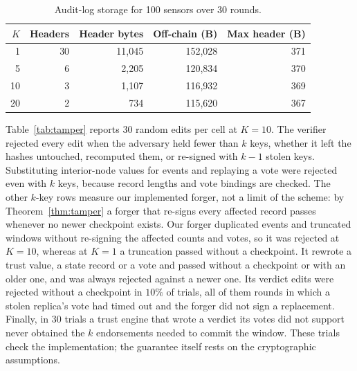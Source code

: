 \documentclass{ieeeaccess}
\begin{document}
\begin{table}[!t]
\caption{Audit-log storage for 100 sensors over 30 rounds.}
\label{tab:chain}
\centering
\renewcommand{\arraystretch}{1.08}
\footnotesize
\setlength{\tabcolsep}{4pt}
\begin{tabular}{rrrrr}
\toprule
$K$ & \textbf{Headers} & \textbf{Header bytes} & \textbf{Off-chain (B)} & \textbf{Max header (B)} \\
\midrule
1 & 30 & 11{,}045 & 152{,}028 & 371 \\
5 & 6 & 2{,}205 & 120{,}834 & 370 \\
10 & 3 & 1{,}107 & 116{,}932 & 369 \\
20 & 2 & 734 & 115{,}620 & 367 \\
\bottomrule
\end{tabular}
\end{table}

Table~\ref{tab:tamper} reports $30$ random edits per cell at $K=10$.
The verifier rejected every edit when the adversary held fewer than
$k$ keys, whether it left the hashes untouched, recomputed them, or
re-signed with $k-1$ stolen keys.  Substituting interior-node values
for events and replaying a vote were rejected even with $k$ keys,
because record lengths and vote bindings are checked.  The other
$k$-key rows measure our implemented forger, not a limit of the
scheme: by Theorem~\ref{thm:tamper} a forger that re-signs every
affected record passes whenever no newer checkpoint exists.  Our
forger duplicated events and truncated windows without re-signing the
affected counts and votes, so it was rejected at $K=10$, whereas at
$K=1$ a truncation passed without a checkpoint.  It rewrote a trust
value, a state record or a vote and passed without a checkpoint or
with an older one, and was always rejected against a newer one.  Its
verdict edits were rejected without a checkpoint in $10\%$ of trials,
all of them rounds in which a stolen replica's vote had timed out and
the forger did not sign a replacement.  Finally, in $30$ trials a trust engine
that wrote a verdict its votes did not support never obtained the $k$
endorsements needed to commit the window.  These trials check the
implementation; the guarantee itself rests on the cryptographic
assumptions.
\end{document}
